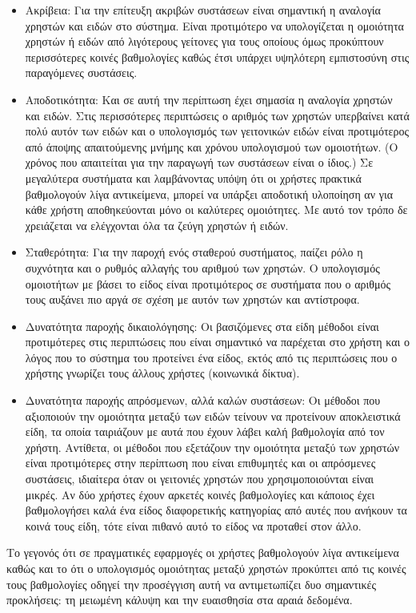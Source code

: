 \begin{itemize}
 \item Ακρίβεια: Για την επίτευξη ακριβών συστάσεων είναι σημαντική η αναλογία χρηστών και ειδών στο σύστημα. Είναι προτιμότερο να υπολογίζεται η ομοιότητα χρηστών ή ειδών από λιγότερους γείτονες για τους οποίους όμως προκύπτουν περισσότερες κοινές βαθμολογίες καθώς έτσι υπάρχει υψηλότερη εμπιστοσύνη στις παραγόμενες συστάσεις.
 \item Αποδοτικότητα: Και σε αυτή την περίπτωση έχει σημασία η αναλογία χρηστών και ειδών. Στις περισσότερες περιπτώσεις ο αριθμός των χρηστών υπερβαίνει κατά πολύ αυτόν των ειδών και ο υπολογισμός των γειτονικών ειδών είναι προτιμότερος από άποψης απαιτούμενης μνήμης και χρόνου υπολογισμού των ομοιοτήτων. (Ο χρόνος που απαιτείται για την παραγωγή των συστάσεων είναι ο ίδιος.) Σε μεγαλύτερα συστήματα και λαμβάνοντας υπόψη ότι οι χρήστες πρακτικά βαθμολογούν λίγα αντικείμενα, μπορεί να υπάρξει αποδοτική υλοποίηση αν για κάθε χρήστη αποθηκεύονται μόνο οι καλύτερες ομοιότητες. Με αυτό τον τρόπο δε χρειάζεται να ελέγχονται όλα τα ζεύγη χρηστών ή ειδών.
 \item Σταθερότητα: Για την παροχή ενός σταθερού συστήματος, παίζει ρόλο η συχνότητα και ο ρυθμός αλλαγής του αριθμού των χρηστών. Ο υπολογισμός ομοιοτήτων με βάσει το είδος είναι προτιμότερος σε συστήματα που ο αριθμός τους αυξάνει πιο αργά σε σχέση με αυτόν των χρηστών και αντίστροφα. 
 \item Δυνατότητα παροχής δικαιολόγησης: Οι βασιζόμενες στα είδη μέθοδοι εί\-ναι προτιμότερες στις περιπτώσεις που είναι σημαντικό να παρέχεται στο χρήστη και ο λόγος που το σύστημα του προτείνει ένα είδος, εκτός από τις περιπτώσεις που ο χρήστης γνωρίζει τους άλλους χρήστες (κοινωνικά δίκτυα). 
 \item Δυνατότητα παροχής απρόσμενων, αλλά καλών συστάσεων: Οι μέθοδοι που αξιοποιούν την ομοιότητα μεταξύ των ειδών τείνουν να προτείνουν αποκλειστικά είδη, τα οποία ταιριάζουν με αυτά που έχουν λάβει καλή βαθμολογία από τον χρήστη. Αντίθετα, οι μέθοδοι που εξετάζουν την ομοιότητα μεταξύ των χρηστών είναι προτιμότερες στην περίπτωση που είναι επιθυμητές και οι απρόσμενες συστάσεις, ιδιαίτερα όταν οι γειτονιές χρηστών που χρησιμοποιούνται είναι μικρές. Αν δύο χρήστες έχουν αρκετές κοινές βαθμολογίες και κάποιος έχει βαθμολογήσει καλά ένα είδος διαφορετικής κατηγορίας από αυτές που ανήκουν τα κοινά τους είδη, τότε είναι πιθανό αυτό το είδος να προταθεί στον άλλο.
\end{itemize}\par
Το γεγονός ότι σε πραγματικές εφαρμογές οι χρήστες βαθμολογούν λίγα α\-ντικείμενα καθώς και το ότι ο υπολογισμός ομοιότητας μεταξύ χρηστών προκύπτει από τις κοινές τους βαθμολογίες οδηγεί την προσέγγιση αυτή να αντιμετωπίζει δυο σημαντικές προκλήσεις: τη μειωμένη κάλυψη και την ευαισθησία στα αραιά δεδομένα. \par
